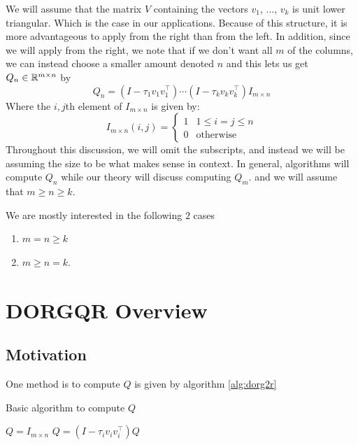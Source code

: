 \documentclass[12pt]{article}
\begin{document}
    We will assume that the matrix $V$ containing the vectors $v_1$, ..., $v_k$ is unit lower triangular. Which is the case in our applications.
    Because of this structure, it is more advantageous to apply from the right than from the left.
    In addition, since we will apply from the right, 
    we note that if we don't want all $m$ of the columns, we can instead choose a smaller amount denoted $n$ 
    and this lets us get $Q_n\in\mathbb{R}^{m\times n}$ by 
    \begin{equation}\label{eq:Qn}
        Q_n = \left(I - \tau_1 v_1v_1^\top\right)\cdots\left(I - \tau_kv_kv_k^\top\right)I_{m\times n}
    \end{equation}
    Where the $i,j$th element of $I_{m\times n}$ is given by:
    \begin{equation*}
        I_{m\times n}(i,j) = \begin{cases}
            1 & 1\leq i = j\leq n\\
            0 & \text{otherwise}
        \end{cases}
    \end{equation*}
    Throughout this discussion, we will omit the subscripts, and instead we will be assuming the size to be 
    what makes sense in context. In general, algorithms will compute $Q_n$ while our theory will discuss computing $Q_m$. 
    and we will assume that $m\geq n\geq k$.

    We are mostly interested in the following $2$ cases
    \begin{enumerate}
        \item $m=n\geq k$
        \item $m\geq n=k$.
    \end{enumerate}


    \section{DORGQR Overview}

    \subsection{Motivation}

    One method is to compute $Q$ is given by algorithm \ref{alg:dorg2r}

    \begin{algorithm}
        \caption{Basic algorithm to compute $Q$}\label{alg:dorg2r}
        \begin{algorithmic}[1]
            \STATE $Q= I_{m\times n}$
                \STATE $Q= \left(I-\tau_iv_iv_i^\top\right)Q$
            \ENDFOR
        \end{algorithmic}
    \end{algorithm}
\end{document}
